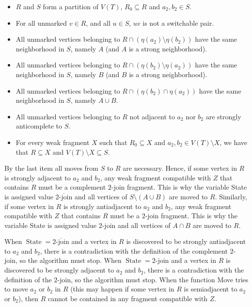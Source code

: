 \documentclass[11 pt] {article}
\DeclareMathOperator{\State}{State}
\begin{document}
\begin{itemize}
\item $R$ and $S$ form a partition of $V(T)$, $R_0\subseteq  R$ and
  $a_2, b_2 \in S$.

\item For all unmarked $v \in R$, and all $u\in S$, $uv$ is not a
  switchable pair.  

\item All unmarked vertices belonging to $R \cap (\eta(a_{2})
  \setminus \eta(b_2))$ have the same neighborhood in $S$, namely $A$
  (and $A$ is a strong neighborhood).

\item All unmarked vertices belonging to $R\cap (\eta(b_{2}) \setminus
  \eta(a_2))$ have the same neighborhood in $S$, namely $B$ (and $B$
  is a strong neighborhood).

\item All unmarked vertices belonging to $R\cap (\eta(b_{2}) \cap
  \eta(a_2))$ have the same neighborhood in $S$, namely $A \cup B$.

\item All unmarked  vertices belonging to $R$ not adjacent to $a_{2}$ 
nor $b_{2}$ are strongly anticomplete to $S$.

\item For every weak fragment $X$ such that $R_0 \subseteq X$ and
  $a_2,b_2 \in V(T)\setminus X$, we have that $R \subseteq X$ and
  $V(T)\setminus X \subseteq S$.
\end{itemize}

By the last item all moves from $S$ to $R$ are necessary.  Hence, if
some vertex in $R$ is strongly adjacent to $a_2$ and $b_2$, any weak
fragment compatible with $Z$ that contains $R$ must be a complement
$2$-join fragment.  This is why the variable State is assigned value
$\overline{\text{$2$-join}}$ and all vertices of $S\setminus (A \cup
B)$ are moved to $R$.  Similarly, if some vertex in $R$ is strongly
antiadjacent to $a_2$ and $b_2$, any weak fragment compatible with $Z$
that contains $R$ must be a $2$-join fragment.  This is why the variable
State is assigned value ${\text{$2$-join}}$ and all vertices of $A
\cap B$ are moved to $R$.

When $\State = \overline{\text{$2$-join}}$ and a vertex in $R$ is
discovered to be strongly antiadjacent to $a_2$ and $b_2$, there is a
contradiction with the definition of the complement $2$-join, so the
algorithm must stop.  When $\State = {\text{$2$-join}}$ and a vertex
in $R$ is discovered to be strongly adjacent to $a_2$ and $b_2$, there
is a contradiction with the definition of the $2$-join, so the
algorithm must stop.  When the function Move tries to move $a_2$ or
$b_2$ in $R$ (this may happen if some vertex in $R$ is semiadjacent to $a_2$
or $b_2$), then $R$ cannot be contained in any
fragment compatible with $Z$.
\end{document}
